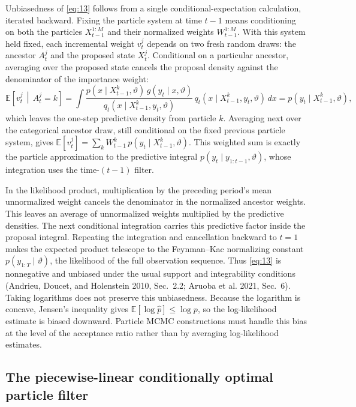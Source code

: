 \documentclass[11pt]{article}
\begin{document}
Unbiasedness of \eqref{eq:13} follows from a single
conditional-expectation calculation, iterated backward. Fixing the particle
system at time $t-1$ means conditioning on both
the particles $X_{t-1}^{1:M}$ and their normalized
weights $W_{t-1}^{1:M}$. With this system held fixed, each
incremental weight $v_t^j$ depends on two fresh
random draws: the ancestor $A_t^j$ and the
proposed state $X_t^j$. Conditional on a particular
ancestor, averaging over the proposed state cancels the proposal density
against the denominator of the importance weight:
\[
 \mathbb E\!\left[v_t^j \,\middle|\, A_t^j=k\right]
 =\int \frac{p(x\mid X_{t-1}^{k},\vartheta)\,g(y_t\mid x,\vartheta)}
            {q_t(x\mid X_{t-1}^{k},y_t,\vartheta)}\,
       q_t(x\mid X_{t-1}^{k},y_t,\vartheta)\,dx
 =p(y_t\mid X_{t-1}^{k},\vartheta),
\]
which leaves the one-step predictive density from particle
$k$. Averaging next over the categorical
ancestor draw, still conditional on the fixed previous particle system,
gives $\mathbb E[v_t^j]=\sum_k W_{t-1}^k\,p(y_t\mid X_{t-1}^{k},\vartheta)$. This weighted sum is exactly the
particle approximation to the predictive integral
$p(y_t\mid y_{1:t-1},\vartheta)$, whose integration uses the
time-$(t-1)$ filter.

In the likelihood product, multiplication by the preceding period's mean
unnormalized weight cancels the denominator in the normalized ancestor
weights. This leaves an average of unnormalized weights multiplied by the
predictive densities. The next conditional integration carries this
predictive factor inside the proposal integral. Repeating the integration
and cancellation backward to $t=1$ makes the
expected product telescope to the Feynman--Kac normalizing constant
$p(y_{1:T}\mid\vartheta)$, the likelihood of the full observation
sequence. Thus \eqref{eq:13} is nonnegative and unbiased
under the usual support and integrability conditions (Andrieu,
Doucet, and Holenstein 2010, Sec.~2.2; Aruoba et al. 2021, Sec.~6). Taking
logarithms does not preserve this unbiasedness. Because the logarithm is
concave, Jensen's inequality gives
$\mathbb E[\log\widehat p]\leq\log p$, so the log-likelihood estimate is biased
downward. Particle MCMC constructions must handle this bias at the level of
the acceptance ratio rather than by averaging log-likelihood estimates.

\subsection{The piecewise-linear conditionally optimal particle filter}
\label{sec:copf}
\end{document}
